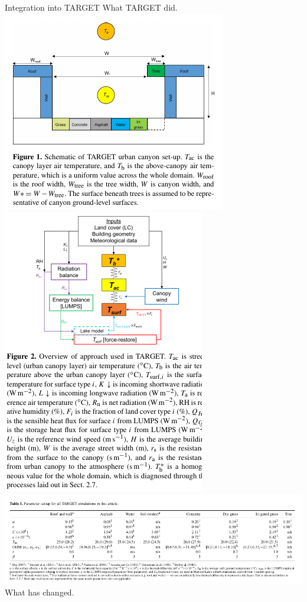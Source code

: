 \documentclass{beamer}
\begin{document}
\begin{frame}{Integration into TARGET} 
What TARGET did.
\\
\includegraphics[scale=0.30]{TARGET1.png}~
\includegraphics[scale=0.30]{TARGET2.png}
\\
\includegraphics[scale=0.30]{TARGET3.png}
\\
What has changed.

\citep{Broadbent2019}

\end{frame}
\end{document}
